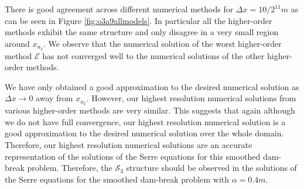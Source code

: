 \documentclass[times]{elsarticle}
\begin{document}
There is good agreement across different numerical methods for $\Delta x = 10/2^{11}m$ as can be seen in Figure \ref{fig:o3a9allmodels}. In particular all the higher-order methods exhibit the same structure and only disagree in a very small region around $x_{u_2}$. We observe that the numerical solution of the worst higher-order method $\mathcal{E}$ has not converged well to the numerical solutions of the other higher-order methods. 

We have only obtained a good approximation to the desired numerical solution as $\Delta x \rightarrow 0$ away from $x_{u_2}$. However, our highest resolution numerical solutions from various higher-order methods are very similar. This suggests that again although we do not have full convergence, our highest resolution numerical solution is a good approximation to the desired numerical solution over the whole domain. Therefore, our highest resolution numerical solutions are an accurate representation of the solutions of the Serre equations for this smoothed dam-break problem. Therefore, the $\mathcal{S}_3$ structure should be observed in the solutions of the Serre equations for the smoothed dam-break problem with $\alpha = 0.4m$.
\end{document}
